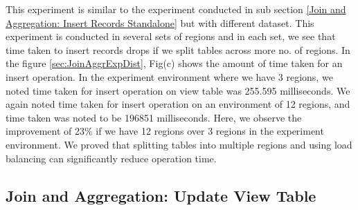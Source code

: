\documentclass[11pt,a4paper,bibtotoc,idxtotoc,headsepline,footsepline,footexclude,BCOR12mm,DIV13]{scrbook}
\begin{document}
This experiment is similar to the experiment conducted in sub section \ref{Join and Aggregation: Insert Records Standalone} but with different dataset. This experiment is conducted in several sets of regions and in each set, we see that time taken to insert records drops if we split tables across more no. of regions. In the figure \ref{sec:JoinAggrExpDist}, Fig(c) shows the amount of time taken for an insert operation. In the experiment environment where we have 3 regions, we noted time taken for insert operation on view table was 255.595 milliseconds. We again noted time taken for insert operation on an environment of 12 regions, and time taken was noted to be 196851 milliseconds. Here, we observe the improvement of 23\% if we have 12 regions over 3 regions in the experiment environment. We proved that splitting tables into multiple regions and using load balancing can significantly reduce operation time.


\subsection{Join and Aggregation: Update View Table} 
\label{Join and Aggr: Update View Table Distributed}
\end{document}
